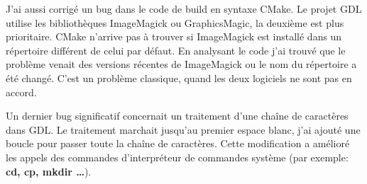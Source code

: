 J'ai aussi corrigé un bug dans le code de build en syntaxe CMake. Le projet GDL utilise les bibliothèques ImageMagick ou GraphicsMagic, la deuxième est plus prioritaire. CMake n'arrive pas à trouver si ImageMagick est installé dans un répertoire différent de celui par défaut. En analysant le code j'ai trouvé que le problème venait des versions récentes de ImageMagick ou le nom du répertoire a été changé. C'est un problème classique, quand les deux logiciels ne sont pas en accord.

Un dernier bug significatif concernait un traitement d'une chaîne de caractères dans GDL. Le traitement marchait jusqu'au premier espace blanc, j'ai ajouté une boucle pour passer toute la chaîne de caractères. Cette modification a amélioré les appels des commandes d'interpréteur de commandes système (par exemple: \textbf{cd, cp, mkdir \ldots}).









